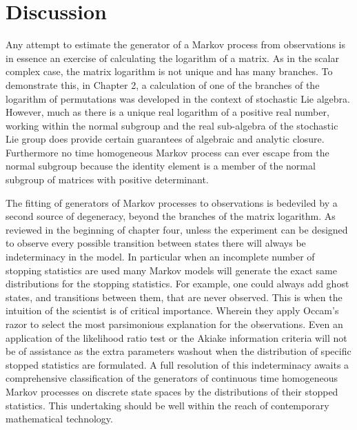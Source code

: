 \section{Discussion}
Any attempt to estimate the generator of a Markov process from observations is in essence an 
exercise of calculating the logarithm of a matrix. As in the scalar complex case, the matrix 
logarithm is not unique and has many branches. To demonstrate this, in Chapter 2, a 
calculation of one of the branches of the logarithm of permutations was developed in the
context of stochastic Lie algebra. However, much as there is a unique real logarithm of a 
positive real number, working within the normal subgroup and the real sub-algebra of the 
stochastic Lie group does provide certain guarantees of algebraic and analytic closure. 
Furthermore no time homogeneous Markov process can ever escape from the normal subgroup 
because the identity element is a member of the normal subgroup of matrices with positive 
determinant.

The fitting of generators of Markov processes to observations is bedeviled by a second
source of degeneracy, beyond the branches of the matrix logarithm. As reviewed in the 
beginning of chapter four, unless the experiment can be designed to observe every possible 
transition between states there will always be indeterminacy in the model. In particular 
when an incomplete number of stopping statistics are used many Markov models will generate 
the exact same distributions for the stopping statistics. For example, one could always add 
ghost states, and transitions between them, that are never observed. This is when the 
intuition of the scientist is of critical importance. Wherein they apply Occam's razor to 
select the most parsimonious explanation for the observations. Even an application of the 
likelihood ratio test or the Akiake information criteria \cite{akaike_new_1974} will not be 
of assistance as the extra parameters washout when the distribution of specific stopped
statistics are formulated. A full resolution of this indeterminacy awaits a comprehensive
classification of the generators of continuous time homogeneous Markov processes on discrete
state spaces by the distributions of their stopped statistics. This undertaking should be
well within the reach of contemporary mathematical technology.

